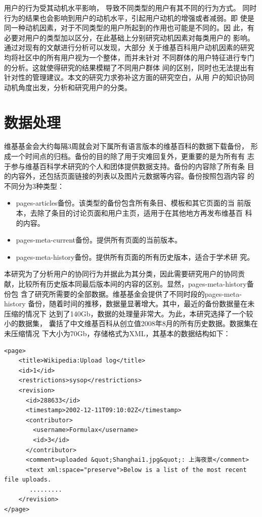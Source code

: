 用户的行为受其动机水平影响，
导致不同类型的用户有其不同的行为方式。
同时行为的结果也会影响到用户的动机水平，引起用户动机的增强或者减弱。即
使是同一种动机因素，对于不同类型的用户所起到的作用也可能是不同的。因
此，有必要对用户的类型加以区分，在此基础上分别研究动机因素对每类用户的
影响。通过对现有的文献进行分析可以发现，大部分
关于维基百科用户动机因素的研究均将社区中的所有用户视为一个整体，而并未针对
不同群体的用户特征进行专门的分析。这就使得研究的结果模糊了不同用户群体
间的区别，同时也无法提出有针对性的管理建议。本文的研究力求弥补这方面的研究空白，从用
户的知识协同动机角度出发，分析和研究用户的分类。

\section{数据处理}
\label{sec:wikimedia-data}

维基基金会大约每隔3周就会对下属所有语言版本的维基百科的数据下载备份，
形成一个时间点的归档。备份的目的除了用于灾难回复外，更重要的是为所有有
志于参与维基百科学术研究的个人和团体提供数据支持。备份的内容除了所有条
目的内容外，还包括页面链接的列表以及图片元数据等内容。备份按照包涵内容
的不同分为3种类型：
\begin{itemize}
\item pages-articles备份。该类型的备份包含所有条目、模板和其它页面的当
  前版本，去除了条目的讨论页面和用户主页，适用于在其他地方再发布维基百
  科的内容。
\item pages-meta-current备份。提供所有页面的当前版本。
\item pages-meta-history备份。提供所有页面的所有历史版本，适合于学术研
  究。
\end{itemize}

本研究为了分析用户的协同行为并据此为其分类，因此需要研究用户的协同贡
献，比较所有历史版本同最后版本间的内容的区别。显然，pages-meta-history备份包
含了研究所需要的全部数据。维基基金会提供了不同时段的pages-meta-history
备份，随着时间的推移，数据量显著增大。其中，最近的备份数据量在未压缩的情况下
达到了140Gb，数据的处理量非常大。为此，本研究选择了一个较小的数据集，
囊括了中文维基百科从创立值2008年8月的所有历史数据。数据集在未压缩情况
下大小为70Gb，存储格式为XML，其基本的数据结构如下：

\begin{verbatim}
<page>
    <title>Wikipedia:Upload log</title>
    <id>1</id>
    <restrictions>sysop</restrictions>
    <revision>
      <id>288633</id>
      <timestamp>2002-12-11T09:10:02Z</timestamp>
      <contributor>
        <username>Formulax</username>
        <id>3</id>
      </contributor>
      <comment>uploaded &quot;Shanghai1.jpg&quot;: 上海夜景</comment>
      <text xml:space="preserve">Below is a list of the most recent file uploads.
       .........
    </revision>
</page>
\end{verbatim}

